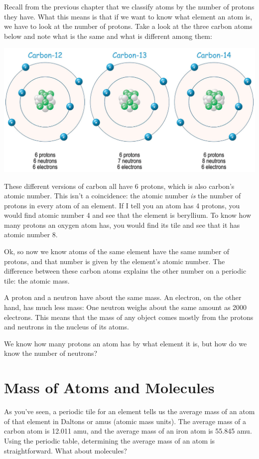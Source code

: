 Recall from the previous chapter that we classify atoms by the number of protons
they have. What this means is that if we want to know what element an atom is, we
have to look at the number of protons. Take a look at the three carbon atoms below
and note what is the same and what is different among them:

\begin{center}
\includegraphics[scale=0.35]{carbon_iso.png}
\end{center}

These different versions of carbon all have 6 protons, which is also carbon's 
atomic number. This isn't a coincidence: the atomic number \textit{is} the number
of protons in every atom of an element. If I tell you an atom has 4 protons, you 
would find atomic number 4 and see that the element is beryllium. To know how many
protons an oxygen atom has, you would find its tile and see that it has atomic 
number 8. 

Ok, so now we know atoms of the same element have the same number of protons, and
that number is given by the element's atomic number. The difference between these
carbon atoms explains the other number on a periodic tile: the atomic mass. 

A proton and a neutron have about the same mass. An electron, on the other hand,
has much less mass: One neutron weighs about the same amount as 2000 electrons. 
This means that the mass of any object comes mostly from the protons and neutrons
in the nucleus of its atoms.  

We know how many protons an atom has by what element it is, but how do we know the 
number of neutrons?

\section{Mass of Atoms and Molecules}
As you've seen, a periodic tile for an element tells us the average mass of an 
atom of that element in Daltons or amus (atomic mass units). The average mass of a
carbon atom is 12.011 amu, and the average mass of an iron atom is 55.845 amu. 
Using the periodic table, determining the average mass of an atom is 
straightforward. What about molecules?

